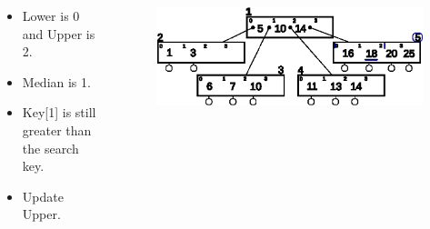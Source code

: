 \documentclass{beamer}
\begin{document}
\begin{frame}[t,allowframebreaks]
    \begin{columns}
        \begin{column}{.4\textwidth}
            \vspace{-1cm}
            \begin{block}{}
                \begin{itemize}
                    \item Lower is 0 and Upper is 2.
                    \item Median is 1.
                    \item Key[1] is still greater than the search key.
                    \item Update Upper.
                \end{itemize}
            \end{block}
        \end{column}
        \begin{column}{.6\textwidth}
            \vspace{-1cm}
            \begin{block}{}
                \begin{figure}[h!]
                    \includegraphics[width=\linewidth]{resources/made/btree_search_step4.eps}
                \end{figure}    
                \btreeSearchStepFour
            \end{block}
        \end{column}
    \end{columns}

    \framebreak


\end{frame}
\end{document}
